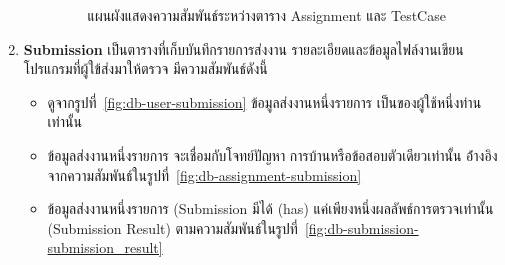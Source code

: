 \documentclass[12pt,one side,openright,a4paper]{cpe-thesis-th}
\begin{document}
\begin{enumerate}
\begin{itemize}
\begin{figure}[H]
                        \caption[แผนผังแสดงความสัมพันธ์ระหว่างตาราง Assignment และ TestCase]{แผนผังแสดงความสัมพันธ์ระหว่างตาราง Assignment และ TestCase}
                        \label{fig:db-assignment-testcase}
                    \end{figure}
                \end{itemize}
        \item \textbf{Submission}
            เป็นตารางที่เก็บบันทึกรายการส่งงาน รายละเอียดและข้อมูลไฟล์งานเขียนโปรแกรมที่ผู้ใข้ส่งมาให้ตรวจ มีความสัมพันธ์ดังนี้
                \begin{itemize}
                    \item ดูจากรูปที่~\ref{fig:db-user-submission} ข้อมูลส่งงานหนึ่งรายการ เป็นของผู้ใช้หนึ่งท่านเท่านั้น
                    \item ข้อมูลส่งงานหนึ่งรายการ จะเชื่อมกับโจทย์ปัญหา การบ้านหรือข้อสอบตัวเดียวเท่านั้น อ้่างอิงจากความสัมพันธ์ในรูปที่~\ref{fig:db-assignment-submission}
                    \item ข้อมูลส่งงานหนึ่งรายการ (Submission มีได้ (has) แค่เพียงหนึ่งผลลัพธ์การตรวจเท่านั้น (Submission Result) ตามความสัมพันธ์ในรูปที่~\ref{fig:db-submission-submission_result}
                    \begin{figure}[H]
                        \centering 

\end{figure}
\end{itemize}
\end{enumerate}
\end{document}
